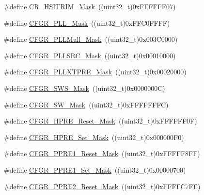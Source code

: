 \begin{DoxyCompactItemize}
\item 
\#define \mbox{\hyperlink{group___r_c_c___private___defines_gac6a6adccdfb5a34541e2cdf01daf98ce}{C\+R\+\_\+\+H\+S\+I\+T\+R\+I\+M\+\_\+\+Mask}}~((uint32\+\_\+t)0x\+F\+F\+F\+F\+F\+F07)
\item 
\#define \mbox{\hyperlink{group___r_c_c___private___defines_gaea605b2eaea5332218130fc2d20d917c}{C\+F\+G\+R\+\_\+\+P\+L\+L\+\_\+\+Mask}}~((uint32\+\_\+t)0x\+F\+F\+C0\+F\+F\+F\+F)
\item 
\#define \mbox{\hyperlink{group___r_c_c___private___defines_ga26ac4de307d4c081867dc0344f54c17a}{C\+F\+G\+R\+\_\+\+P\+L\+L\+Mull\+\_\+\+Mask}}~((uint32\+\_\+t)0x003\+C0000)
\item 
\#define \mbox{\hyperlink{group___r_c_c___private___defines_ga8fd33db1092dfc565314b7bf395bba23}{C\+F\+G\+R\+\_\+\+P\+L\+L\+S\+R\+C\+\_\+\+Mask}}~((uint32\+\_\+t)0x00010000)
\item 
\#define \mbox{\hyperlink{group___r_c_c___private___defines_ga025835ddeb698b8c119ddf355b2fbded}{C\+F\+G\+R\+\_\+\+P\+L\+L\+X\+T\+P\+R\+E\+\_\+\+Mask}}~((uint32\+\_\+t)0x00020000)
\item 
\#define \mbox{\hyperlink{group___r_c_c___private___defines_gaefba904c88a72c7e2c12e8fcef38300a}{C\+F\+G\+R\+\_\+\+S\+W\+S\+\_\+\+Mask}}~((uint32\+\_\+t)0x0000000\+C)
\item 
\#define \mbox{\hyperlink{group___r_c_c___private___defines_ga41e0b286664f76c2057cffb134809c51}{C\+F\+G\+R\+\_\+\+S\+W\+\_\+\+Mask}}~((uint32\+\_\+t)0x\+F\+F\+F\+F\+F\+F\+F\+C)
\item 
\#define \mbox{\hyperlink{group___r_c_c___private___defines_ga55937d93be56562243d92c507145112c}{C\+F\+G\+R\+\_\+\+H\+P\+R\+E\+\_\+\+Reset\+\_\+\+Mask}}~((uint32\+\_\+t)0x\+F\+F\+F\+F\+F\+F0\+F)
\item 
\#define \mbox{\hyperlink{group___r_c_c___private___defines_gaca06c6cc484e08423a56cfca6928b9ae}{C\+F\+G\+R\+\_\+\+H\+P\+R\+E\+\_\+\+Set\+\_\+\+Mask}}~((uint32\+\_\+t)0x000000\+F0)
\item 
\#define \mbox{\hyperlink{group___r_c_c___private___defines_gab02d8032f451eb5a1d139007ff57f22e}{C\+F\+G\+R\+\_\+\+P\+P\+R\+E1\+\_\+\+Reset\+\_\+\+Mask}}~((uint32\+\_\+t)0x\+F\+F\+F\+F\+F8\+F\+F)
\item 
\#define \mbox{\hyperlink{group___r_c_c___private___defines_ga74838e1873c5e4c46eef61a81b1bd2c5}{C\+F\+G\+R\+\_\+\+P\+P\+R\+E1\+\_\+\+Set\+\_\+\+Mask}}~((uint32\+\_\+t)0x00000700)
\item 
\#define \mbox{\hyperlink{group___r_c_c___private___defines_gab2ee73d52f48cb201e493e381928d1ae}{C\+F\+G\+R\+\_\+\+P\+P\+R\+E2\+\_\+\+Reset\+\_\+\+Mask}}~((uint32\+\_\+t)0x\+F\+F\+F\+F\+C7\+F\+F)

\end{DoxyCompactItemize}

